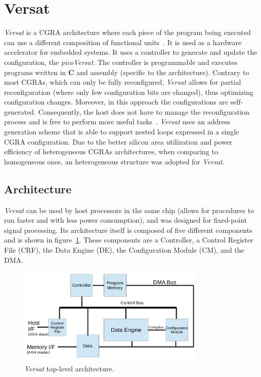 \section{Versat}
\label{section:versat}

{\it Versat} is a {\sc CGRA} architecture where each piece of the program being
executed can use a different composition of functional units~\cite{deSousa12}.
It is used as a hardware accelerator for embedded systems.  It uses a controller
to generate and update the configuration, the {\it picoVersat}.  The controller
is programmable and executes programs written in {\bf C} and assembly (specific
to the architecture).  Contrary to most {\sc CGRA}s, which can only be fully
reconfigured, {\it Versat} allows for partial reconfiguration (where only few
configuration bits are changed), thus optimizing configuration changes.
Moreover, in this approach the configurations are self-generated. Consequently,
the host does not have to manage the reconfiguration process and is free to
perform more useful tasks~\cite{Lopes2017}.  {\it Versat} uses an address
generation scheme that is able to support nested loops expressed in a single
{\sc CGRA} configuration.  Due to the better silicon area utilization and power
efficiency of heterogeneous {\sc CGRA}s architectures, when comparing to
homogeneous ones, an heterogeneous structure was adopted for {\it Versat}.

\subsection{Architecture}

{\it Versat} can be used by host processors in the same chip (allows for
procedures to run faster and with less power consumption), and was designed for
fixed-point signal processing. Its architecture itself is composed of five
different components and is shown in figure~\ref{fig:versat_arch}. These
components are a Controller, a Control Register File ({\sc CRF}), the Data
Engine ({\sc DE}), the Configuration Module ({\sc CM}), and the {\sc DMA}.


\begin{figure}[!htbp]
    \centerline{\includegraphics[width=0.8\textwidth]{Figures/top.png}}
    \vspace{0cm}\caption{{\it Versat} top-level architecture.}
    \label{fig:versat_arch}
\end{figure}

